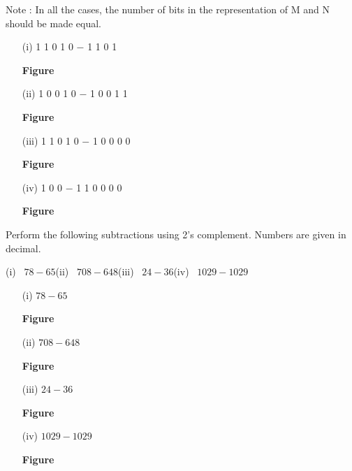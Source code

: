 \begin{solution}
Note : In all the cases, the number of bits in the representation of M and N should be made equal.
\begin{itemize}
\item[(i)] 1 1 0 1 0 $-$ 1 1 0 1
\begin{center}
{\bf Figure}
\end{center}

\item[(ii)] 1 0 0 1 0 $-$ 1 0 0 1 1
\begin{center}
{\bf Figure}
\end{center}

\item[(iii)] 1 1 0 1 0 $-$ 1 0 0 0 0
\begin{center}
{\bf Figure}
\end{center}

\item[(iv)] 1 0 0 $-$ 1 1 0 0 0 0
\begin{center}
{\bf Figure}
\end{center}
\end{itemize}
\end{solution}

\begin{problem}\label{prob5.30}
Perform the following subtractions using 2's complement. Numbers are given in decimal.

\smallskip
(i)~ $78-65$\hfil (ii)~ $708-648$\hfil (iii)~ $24-36$\hfil (iv)~ $1029-1029$
\end{problem}

\begin{solution}
\begin{itemize}
\item[(i)] $78-65$
\begin{center}
{\bf Figure}
\end{center}

\item[(ii)] $708-648$
\begin{center}
{\bf Figure}
\end{center}

\item[(iii)] $24-36$
\begin{center}
{\bf Figure}
\end{center}

\item[(iv)] $1029-1029$
\begin{center}
{\bf Figure}
\end{center}
\end{itemize}
\end{solution}

